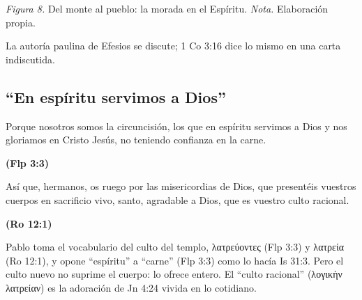 \documentclass[11pt,letterpaper]{article}
\newcommand{\grc}[1]{\foreignlanguage{ancientgreek}{#1}}
\newcommand{\fuente}[1]{\par\hfill{\upshape\bfseries\small\textcolor{azul}{#1}}}
\begin{document}
\begin{center}
\par
{\footnotesize\color{gris}\textit{Figura 8.} Del monte al pueblo: la morada en el Espíritu. \textit{Nota.} Elaboración propia.}
\end{center}

\begin{nota}[Precisión]
La autoría paulina de Efesios se discute; 1 Co 3:16 dice lo mismo en una carta indiscutida.
\end{nota}

\subsection{``En espíritu servimos a Dios''}

\begin{cita}Porque nosotros somos la circuncisión, los que en espíritu servimos a Dios y nos gloriamos en Cristo Jesús, no teniendo confianza en la carne.\fuente{(Flp 3:3)}\end{cita}

\begin{cita}Así que, hermanos, os ruego por las misericordias de Dios, que presentéis vuestros cuerpos en sacrificio vivo, santo, agradable a Dios, que es vuestro culto racional.\fuente{(Ro 12:1)}\end{cita}

Pablo toma el vocabulario del culto del templo, \grc{λατρεύοντες} (Flp 3:3) y \grc{λατρεία} (Ro 12:1), y opone ``espíritu'' a ``carne'' (Flp 3:3) como lo hacía Is 31:3. Pero el culto nuevo no suprime el cuerpo: lo ofrece entero. El ``culto racional'' (\grc{λογικὴν λατρείαν}) es la adoración de Jn 4:24 vivida en lo cotidiano.
\end{document}
